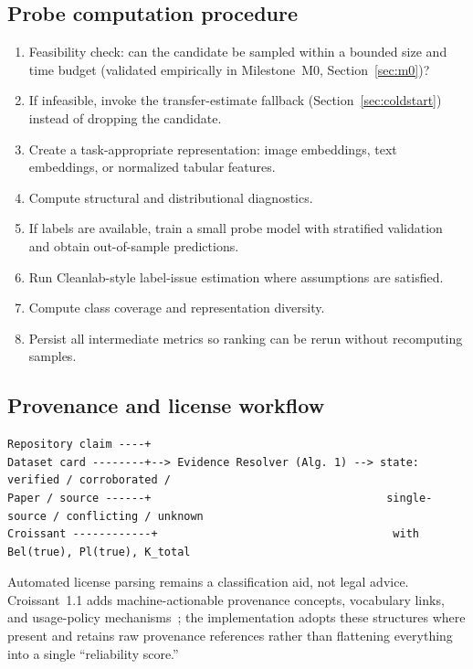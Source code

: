 \documentclass[11pt]{article}
\begin{document}
\subsection{Probe computation procedure}
\begin{enumerate}[leftmargin=*]
\item Feasibility check: can the candidate be sampled within a bounded size and time budget
      (validated empirically in Milestone~M0, Section~\ref{sec:m0})?
\item If infeasible, invoke the transfer-estimate fallback (Section~\ref{sec:coldstart}) instead of
      dropping the candidate.
\item Create a task-appropriate representation: image embeddings, text embeddings, or normalized tabular
      features.
\item Compute structural and distributional diagnostics.
\item If labels are available, train a small probe model with stratified validation and obtain
      out-of-sample predictions.
\item Run Cleanlab-style label-issue estimation where assumptions are satisfied.
\item Compute class coverage and representation diversity.
\item Persist all intermediate metrics so ranking can be rerun without recomputing samples.
\end{enumerate}

\subsection{Provenance and license workflow}
\begin{lstlisting}[basicstyle=\ttfamily\footnotesize]
Repository claim ----+
Dataset card --------+--> Evidence Resolver (Alg. 1) --> state: verified / corroborated /
Paper / source ------+                                    single-source / conflicting / unknown
Croissant ------------+                                    with Bel(true), Pl(true), K_total
\end{lstlisting}
Automated license parsing remains a classification aid, not legal advice. Croissant~1.1 adds
machine-actionable provenance concepts, vocabulary links, and usage-policy mechanisms~\cite{croissant11};
the implementation adopts these structures where present and retains raw provenance references rather than
flattening everything into a single ``reliability score.''

\end{document}
